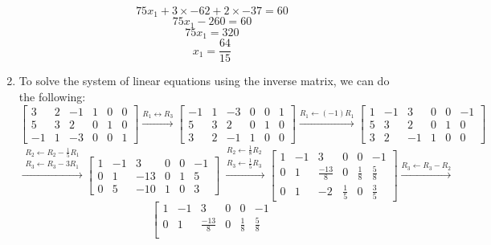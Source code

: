\documentclass[12pt]{article}
\begin{document}
\begin{enumerate}[leftmargin=2em]
    \[75x_1 + 3 \times -62 + 2 \times -37 = 60\]
    \[75x_1 - 260 = 60\]
    \[75x_1 = 320\]
    \[x_1 = \frac{64}{15}\]
    \item
    To solve the system of linear equations using the inverse matrix, we can do the following: 
    \[ 
    \left[ \begin{array}{ccc|ccc}
        3 & 2 & -1 & 1 & 0 & 0  \\
        5 & 3 & 2 & 0 & 1 & 0 \\
        -1 & 1 & -3 & 0 & 0 & 1
    \end{array}\right]
    \xrightarrow{R_1 \leftrightarrow R_3}
    \left[ \begin{array}{ccc|ccc}
        -1 & 1 & -3 & 0 & 0 & 1  \\
        5 & 3 & 2 & 0 & 1 & 0 \\
        3 & 2 & -1 & 1 & 0 & 0
    \end{array}\right]
    \xrightarrow{R_1 \leftarrow (-1)R_1}
    \left[ \begin{array}{ccc|ccc}
        1 & -1 & 3 & 0 & 0 & -1  \\
        5 & 3 & 2 & 0 & 1 & 0 \\
        3 & 2 & -1 & 1 & 0 & 0
    \end{array}\right]
    \]
    \[
    \xrightarrow{\substack{R_2 \leftarrow R_2 - \frac{1}{5}R_1 \\ R_3 \leftarrow R_3 - 3R_1}}
    \left[ \begin{array}{ccc|ccc}
        1 & -1 & 3 & 0 & 0 & -1  \\
        0 & 1 & -13 & 0 & 1 & 5 \\
        0 & 5 & -10 & 1 & 0 & 3
    \end{array}\right]
    \xrightarrow{\substack{R_2 \leftarrow \frac{1}{8}R_2 \\ R_3 \leftarrow \frac{1}{5}R_3}}
    \left[ \begin{array}{ccc|ccc}
        1 & -1 & 3 & 0 & 0 & -1  \\
        0 & 1 & \frac{-13}{8} & 0 & \frac{1}{8} & \frac{5}{8} \\
        0 & 1 & -2 & \frac{1}{5} & 0 & \frac{3}{5}
    \end{array}\right]
    \xrightarrow{R_3 \leftarrow R_3 - R_2}
    \]
    \[ 
    \left[ \begin{array}{ccc|ccc}
        1 & -1 & 3 & 0 & 0 & -1  \\
        0 & 1 & \frac{-13}{8} & 0 & \frac{1}{8} & \frac{5}{8} \\

\end{array}\]
\end{enumerate}
\end{document}
